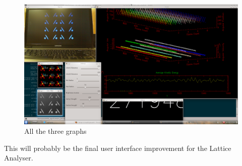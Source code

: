 			\begin{figure}[bth]
				\begin{center}
					\includegraphics[width=1.1\linewidth]{../../latticeAnalyser/screenshots/snapshot11.png}
				\end{center}
			\caption[All the three graphs]{All the three graphs}
			\label{snapshot11}
			\end{figure}
			This will probably be the final user interface improvement for the Lattice Analyser.
